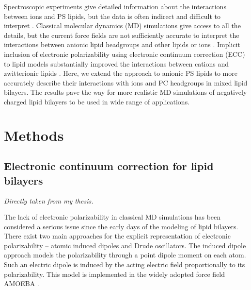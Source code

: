 \documentclass[journal=jpcbfk,manuscript=article]{achemso}
\begin{document}
Spectroscopic experiments give detailed information about the
interactions between ions and PS lipids, but the data is often indirect and difficult to
interpret \cite{hauser77,kurland79,eisenberg79,hauser83,dluhy83,hauser85,feigenson86,mattai89,roux90,roux91,boettcher11}.
Classical molecular dynamics (MD) simulations give
access to all the details, but the current force fields are not
sufficiently accurate to interpret the interactions between anionic
lipid headgroups and other lipids or ions \cite{NMRlipidsIV}.
Implicit inclusion of electronic polarizability using
electronic continuum correction (ECC) to lipid models
substantially improved the interactions between cations and
zwitterionic lipids \cite{melcr18}. Here, we extend the approach
to anionic PS lipids to more accurately describe their interactions with ions
and PC headgroups in mixed lipid bilayers. The results pave
the way for more realistic MD simulations of negatively charged
lipid bilayers to be used in wide range of applications.


 
\section{Methods} 
 
\subsection{Electronic continuum correction for lipid bilayers}\label{section:ecc} 


\emph{ Directly taken from my thesis.}

The lack of electronic polarizability in classical MD simulations
has been considered a serious issue since the early days of the modeling of lipid bilayers. 
There exist two main approaches for the explicit representation of electronic polarizability -- atomic induced dipoles and Drude oscillators.
The induced dipole approach models the polarizability through a point dipole moment on each atom.
Such an electric dipole is induced by the acting electric field proportionally to its polarizability. 
This model is implemented in the widely adopted force field AMOEBA \citep{amoeba06, amoeba10, amoeba13}.
\end{document}

